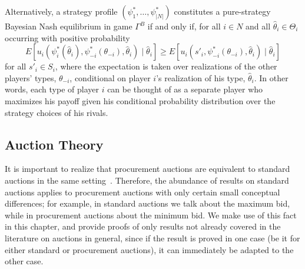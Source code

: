 Alternatively, a strategy profile $(\psi_1^*,\ldots,\psi_{|N|}^*)$ constitutes a pure-strategy Bayesian Nash equilibrium in game $\Gamma^B$ if and only if, for all $i\in N$ and all $\hat{\theta}_i\in\Theta_i$ occurring with positive probability
\begin{equation}
	\label{eq:prop_bayesian_nash_eq}
	E[u_i(\psi^*_i(\hat{\theta}_i),\psi^*_{-i}(\theta_{-i}),\hat{\theta}_i)\mid\hat{\theta}_i] \ge
	E[u_i(s'_i,\psi^*_{-i}(\theta_{-i}),\hat{\theta}_i)\mid\hat{\theta}_i]
\end{equation}
for all $s'_i\in S_i$, where the expectation is taken over realizations of the other players' types, $\theta_{-i}$, conditional on player $i$'s realization of his type, $\hat{\theta}_i$. In other words, each type of player $i$ can be thought of as a separate player who maximizes his payoff given his conditional probability distribution over the strategy choices of his rivals.

\subsection{Auction Theory} %
\label{sub:notation_auction_theory}
It is important to realize that procurement auctions are equivalent to standard auctions in the same setting~\cite{Krishna10}. Therefore, the abundance of results on standard auctions applies to procurement auctions with only certain small conceptual differences; for example, in standard auctions we talk about the maximum bid, while in procurement auctions about the minimum bid. We make use of this fact in this chapter, and provide proofs of only results not already covered in the literature on auctions in general, since if the result is proved in one case (be it for either standard or procurement auctions), it can immediately be adapted to the other case.

